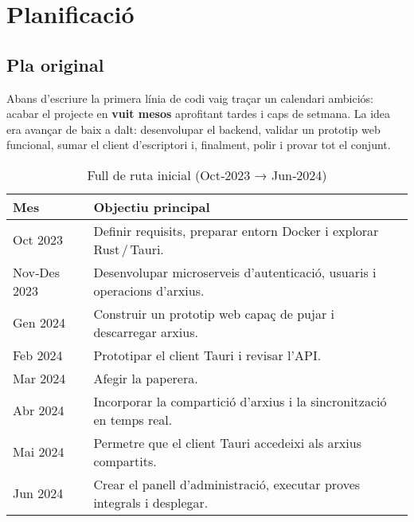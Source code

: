 

\chapter{Planificació}

\section{Pla original}

Abans d'escriure la primera línia de codi vaig traçar un calendari ambiciós: acabar el projecte en \textbf{vuit mesos} aprofitant tardes i caps de setmana. La idea era avançar de baix a dalt: desenvolupar el backend, validar un prototip web funcional, sumar el client d'escriptori i, finalment, polir i provar tot el conjunt.

\begin{table}[h]
  \centering
  \caption{Full de ruta inicial (Oct‑2023 → Jun‑2024)}
  \label{tab:planOriginal}
  \begin{tabular}{@{}p{2cm}p{11cm}@{}}
    \toprule
    \textbf{Mes} & \textbf{Objectiu principal} \\
    \midrule
    Oct 2023 & Definir requisits, preparar entorn Docker i explorar Rust\,/\,Tauri. \\
    Nov‑Des 2023 & Desenvolupar microserveis d'autenticació, usuaris i operacions d'arxius. \\
    Gen 2024 & Construir un prototip web capaç de pujar i descarregar arxius. \\
    Feb 2024 & Prototipar el client Tauri i revisar l'API. \\
    Mar 2024 & Afegir la paperera. \\
    Abr 2024 & Incorporar la compartició d'arxius i la sincronització en temps real. \\
    Mai 2024 & Permetre que el client Tauri accedeixi als arxius compartits. \\
    Jun 2024 & Crear el panell d'administració, executar proves integrals i desplegar. \\
    \bottomrule
  \end{tabular}
\end{table}

